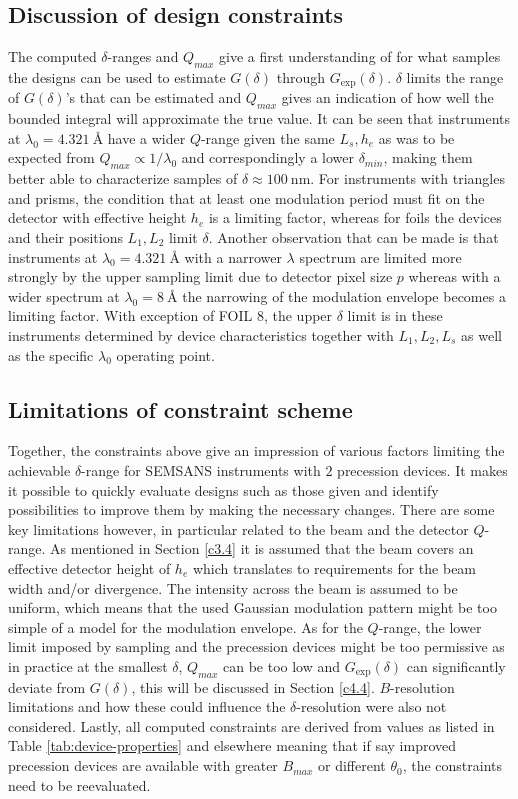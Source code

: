 \subsection{Discussion of design constraints}
The computed $\delta$-ranges and $Q_{max}$ give a first understanding of for what samples the designs can be used to estimate $G(\delta)$ through $G_{\text{exp}}(\delta)$. $\delta$ limits the range of $G(\delta)$'s that can be estimated and $Q_{max}$ gives an indication of how well the bounded integral will approximate the true value. It can be seen that instruments at $\lambda_0 = \SI{4.321}{\angstrom}$ have a wider $Q$-range given the same $L_s, h_e$ as was to be expected from $Q_{max} \propto 1/\lambda_0$ and correspondingly a lower $\delta_{min}$, making them better able to characterize samples of $\delta \approx \SI{100}{\nano\meter}$. For instruments with triangles and prisms, the condition that at least one modulation period must fit on the detector with effective height $h_e$ is a limiting factor, whereas for foils the devices and their positions $L_1, L_2$ limit $\delta$. Another observation that can be made is that instruments at $\lambda_0 = \SI{4.321}{\angstrom}$ with a narrower $\lambda$ spectrum are limited more strongly by the upper sampling limit due to detector pixel size $p$ whereas with a wider spectrum at $\lambda_0 = \SI{8}{\angstrom}$ the narrowing of the modulation envelope becomes a limiting factor. With exception of FOIL 8, the upper $\delta$ limit is in these instruments determined by device characteristics together with $L_1, L_2, L_s$ as well as the specific $\lambda_0$ operating point. 

\subsection{Limitations of constraint scheme}
Together, the constraints above give an impression of various factors limiting the achievable $\delta$-range for SEMSANS instruments with $2$ precession devices. It makes it possible to quickly evaluate designs such as those given and identify possibilities to improve them by making the necessary changes. There are some key limitations however, in particular related to the beam and the detector $Q$-range. As mentioned in Section \ref{c3.4} it is assumed that the beam covers an effective detector height of $h_e$ which translates to requirements for the beam width and/or divergence. The intensity across the beam is assumed to be uniform, which means that the used Gaussian modulation pattern might be too simple of a model for the modulation envelope. As for the $Q$-range, the lower limit imposed by sampling and the precession devices might be too permissive as in practice at the smallest $\delta$, $Q_{max}$ can be too low and $G_\text{exp}(\delta)$ can significantly deviate from $G(\delta)$, this will be discussed in Section \ref{c4.4}. $B$-resolution limitations and how these could influence the $\delta$-resolution were also not considered. Lastly, all computed constraints are derived from values as listed in Table \ref{tab:device-properties} and elsewhere meaning that if say improved precession devices are available with greater $B_{max}$ or different $\theta_0$, the constraints need to be reevaluated.  

